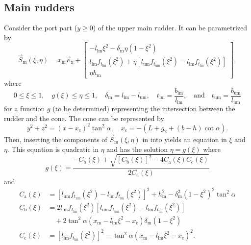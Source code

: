 \subsection{Main rudders}
Consider the port part ($y\geq 0$) of the upper main rudder. It can be parametrized by
\begin{equation}\label{Eq3:mainRudders}
	\vec{S}_{\mathrm{m}}(\xi,\eta) = x_{\mathrm{m}}\vec{e}_{\mathrm{x}} + \begin{bmatrix}
	-l_{\mathrm{lm}} \xi^2-\delta_{\mathrm{m}}\eta\left(1-\xi^2\right)\\
	l_{\mathrm{lm}}f_{t_{\mathrm{lm}}}(\xi^2) + \eta\left[l_{\mathrm{um}}f_{t_{\mathrm{um}}}(\xi^2)-l_{\mathrm{lm}}f_{t_{\mathrm{lm}}}(\xi^2)\right]\\
	\eta h_{\mathrm{m}}
	\end{bmatrix}, 
\end{equation}
where
\begin{equation*}
	0\leq \xi\leq 1,\quad g(\xi)\leq \eta \leq 1,\quad\delta_{\mathrm{m}}=l_{\mathrm{lm}}-l_{\mathrm{um}},\quad t_{\mathrm{lm}}=\frac{b_{\mathrm{lm}}}{l_{\mathrm{lm}}},\quad\text{and}\quad t_{\mathrm{um}}=\frac{b_{\mathrm{um}}}{l_{\mathrm{um}}}
\end{equation*}
for a function $g$ (to be determined) representing the intersection between the rudder and the cone. The cone can be represented by
\begin{equation}\label{Eq3:cone}
	y^2+z^2=\left(x-x_{\mathrm{c}}\right)^2\tan^2\alpha,\quad x_{\mathrm{c}} = -(L+g_2+(b-h)\cot\alpha).
\end{equation}
Then, inserting the components of $\vec{S}_{\mathrm{m}}(\xi,\eta)$ in  into  yields an equation in $\xi$ and $\eta$. This equation is quadratic in $\eta$ and has the solution $\eta=g(\xi)$ where
\begin{equation*}
	g(\xi) = \frac{-C_{\mathrm{b}}(\xi) + \sqrt{[C_{\mathrm{b}}(\xi)]^2-4C_{\mathrm{a}}(\xi)C_{\mathrm{c}}(\xi)}}{2C_{\mathrm{a}}(\xi)}
\end{equation*}
and
\begin{align*}
	C_{\mathrm{a}}(\xi) &= \left[l_{\mathrm{um}}f_{t_{\mathrm{um}}}(\xi^2)-l_{\mathrm{lm}}f_{t_{\mathrm{lm}}}(\xi^2)\right]^2+h_{\mathrm{m}}^2-\delta_{\mathrm{m}}^2(1-\xi^2)^2\tan^2\alpha\\
	C_{\mathrm{b}}(\xi) &= 2l_{\mathrm{lm}}f_{t_{\mathrm{lm}}}(\xi^2)\left[l_{\mathrm{um}}f_{t_{\mathrm{um}}}(\xi^2)-l_{\mathrm{lm}}f_{t_{\mathrm{lm}}}(\xi^2)\right]\\
	&\quad+2\tan^2\alpha\left(x_{\mathrm{m}}-l_{\mathrm{lm}}\xi^2-x_{\mathrm{c}}\right)\delta_{\mathrm{m}}\left(1-\xi^2\right)\\
	C_{\mathrm{c}}(\xi) &= [l_{\mathrm{lm}}f_{t_{\mathrm{lm}}}(\xi^2)]^2 - \tan^2\alpha\left(x_{\mathrm{m}}-l_{\mathrm{lm}}\xi^2-x_{\mathrm{c}}\right)^2.
\end{align*}
